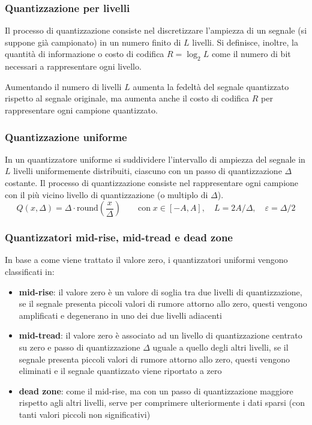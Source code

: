 \subsubsection*{Quantizzazione per livelli}
Il processo di quantizzazione consiste nel discretizzare l'ampiezza di un segnale (si suppone già campionato) in un numero
finito di \(L\) livelli. Si definisce, inoltre, la quantità di informazione o costo di codifica \(R = \log_2 L\) come
il numero di bit necessari a rappresentare ogni livello.

Aumentando il numero di livelli \(L\) aumenta la fedeltà del segnale quantizzato rispetto al segnale originale, ma aumenta
anche il costo di codifica \(R\) per rappresentare ogni campione quantizzato.

\subsubsection*{Quantizzazione uniforme}
In un quantizzatore uniforme si suddividere l'intervallo di ampiezza del segnale in \(L\) livelli uniformemente distribuiti,
ciascuno con un passo di quantizzazione \(\Delta\) costante. Il processo di quantizzazione consiste nel rappresentare ogni
campione con il più vicino livello di quantizzazione (o multiplo di \(\Delta\)).
\[Q(x, \Delta) = \Delta \cdot \text{round}\!\left( \frac{x}{\Delta} \right) \qquad \text{con} \; x \in [-A, A], \quad L = 2A / \Delta, \quad \varepsilon = \Delta / 2 \]

\subsubsection*{Quantizzatori mid-rise, mid-tread e dead zone}
In base a come viene trattato il valore zero, i quantizzatori uniformi vengono classificati in:
\begin{itemize}
	\item \textbf{mid-rise}: il valore zero è un valore di soglia tra due livelli di quantizzazione, se il segnale presenta
	piccoli valori di rumore attorno allo zero, questi vengono amplificati e degenerano in uno dei due livelli adiacenti
	\item \textbf{mid-tread}: il valore zero è associato ad un livello di quantizzazione centrato su zero e passo di
	quantizzazione \(\Delta\) uguale a quello degli altri livelli, se il segnale presenta piccoli valori di rumore attorno
	allo zero, questi vengono eliminati e il segnale quantizzato viene riportato a zero
	\item \textbf{dead zone}: come il mid-rise, ma con un passo di quantizzazione maggiore rispetto agli altri livelli,
	serve per comprimere ulteriormente i dati sparsi (con tanti valori piccoli non significativi)
\end{itemize}

